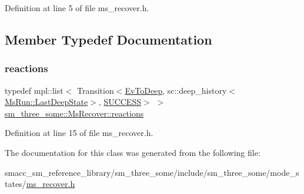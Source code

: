 Definition at line 5 of file ms\+\_\+recover.\+h.



\subsection{Member Typedef Documentation}
\mbox{\label{classsm__three__some_1_1MsRecover_ab41d65bcc8f575199685a12431962bed}} 
\subsubsection{\texorpdfstring{reactions}{reactions}}
{\footnotesize\ttfamily typedef mpl\+::list$<$ Transition$<$\hyperlink{structsm__three__some_1_1EvToDeep}{Ev\+To\+Deep}, sc\+::deep\+\_\+history$<$\hyperlink{classsmacc_1_1SmaccState_a60088405d2d99d468caa0baa3b2830a8}{Ms\+Run\+::\+Last\+Deep\+State}$>$, \hyperlink{classSUCCESS}{S\+U\+C\+C\+E\+SS}$>$ $>$ \hyperlink{classsm__three__some_1_1MsRecover_ab41d65bcc8f575199685a12431962bed}{sm\+\_\+three\+\_\+some\+::\+Ms\+Recover\+::reactions}}



Definition at line 15 of file ms\+\_\+recover.\+h.



The documentation for this class was generated from the following file\+:\begin{DoxyCompactItemize}
\item 
smacc\+\_\+sm\+\_\+reference\+\_\+library/sm\+\_\+three\+\_\+some/include/sm\+\_\+three\+\_\+some/mode\+\_\+states/\hyperlink{ms__recover_8h}{ms\+\_\+recover.\+h}\end{DoxyCompactItemize}
